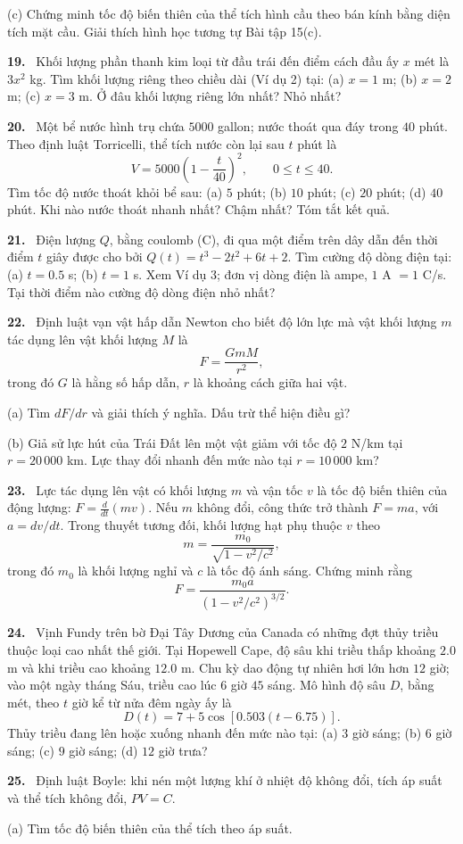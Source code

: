\documentclass[12pt,a4paper]{article}
\newcommand{\bt}[1]{\par\smallskip\noindent\textbf{#1.}\ }
\begin{document}
(c) Chứng minh tốc độ biến thiên của thể tích hình cầu theo bán kính bằng diện tích mặt cầu. Giải thích hình học tương tự Bài tập 15(c).
\bt{19} Khối lượng phần thanh kim loại từ đầu trái đến điểm cách đầu ấy $x$ mét là $3x^2$ kg. Tìm khối lượng riêng theo chiều dài (Ví dụ 2) tại: (a) $x=1$ m; (b) $x=2$ m; (c) $x=3$ m. Ở đâu khối lượng riêng lớn nhất? Nhỏ nhất?
\bt{20} Một bể nước hình trụ chứa $5000$ gallon; nước thoát qua đáy trong $40$ phút. Theo định luật Torricelli, thể tích nước còn lại sau $t$ phút là
\[V=5000\left(1-\frac t{40}\right)^2,\qquad0\le t\le40.\]
Tìm tốc độ nước thoát khỏi bể sau: (a) $5$ phút; (b) $10$ phút; (c) $20$ phút; (d) $40$ phút. Khi nào nước thoát nhanh nhất? Chậm nhất? Tóm tắt kết quả.
\bt{21} Điện lượng $Q$, bằng coulomb (C), đi qua một điểm trên dây dẫn đến thời điểm $t$ giây được cho bởi $Q(t)=t^3-2t^2+6t+2$. Tìm cường độ dòng điện tại: (a) $t=0.5$ s; (b) $t=1$ s. Xem Ví dụ 3; đơn vị dòng điện là ampe, $1$ A $=1$ C/s. Tại thời điểm nào cường độ dòng điện nhỏ nhất?
\bt{22} Định luật vạn vật hấp dẫn Newton cho biết độ lớn lực mà vật khối lượng $m$ tác dụng lên vật khối lượng $M$ là
\[F=\frac{GmM}{r^2},\]
trong đó $G$ là hằng số hấp dẫn, $r$ là khoảng cách giữa hai vật.

(a) Tìm $dF/dr$ và giải thích ý nghĩa. Dấu trừ thể hiện điều gì?

(b) Giả sử lực hút của Trái Đất lên một vật giảm với tốc độ $2$ N/km tại $r=20\,000$ km. Lực thay đổi nhanh đến mức nào tại $r=10\,000$ km?
\bt{23} Lực tác dụng lên vật có khối lượng $m$ và vận tốc $v$ là tốc độ biến thiên của động lượng: $F=\frac{d}{dt}(mv)$. Nếu $m$ không đổi, công thức trở thành $F=ma$, với $a=dv/dt$. Trong thuyết tương đối, khối lượng hạt phụ thuộc $v$ theo
\[m=\frac{m_0}{\sqrt{1-v^2/c^2}},\]
trong đó $m_0$ là khối lượng nghỉ và $c$ là tốc độ ánh sáng. Chứng minh rằng
\[F=\frac{m_0a}{(1-v^2/c^2)^{3/2}}.\]
\bt{24} Vịnh Fundy trên bờ Đại Tây Dương của Canada có những đợt thủy triều thuộc loại cao nhất thế giới. Tại Hopewell Cape, độ sâu khi triều thấp khoảng $2.0$ m và khi triều cao khoảng $12.0$ m. Chu kỳ dao động tự nhiên hơi lớn hơn $12$ giờ; vào một ngày tháng Sáu, triều cao lúc $6$ giờ $45$ sáng. Mô hình độ sâu $D$, bằng mét, theo $t$ giờ kể từ nửa đêm ngày ấy là
\[D(t)=7+5\cos[0.503(t-6.75)].\]
Thủy triều đang lên hoặc xuống nhanh đến mức nào tại: (a) $3$ giờ sáng; (b) $6$ giờ sáng; (c) $9$ giờ sáng; (d) $12$ giờ trưa?
\bt{25} Định luật Boyle: khi nén một lượng khí ở nhiệt độ không đổi, tích áp suất và thể tích không đổi, $PV=C$.

(a) Tìm tốc độ biến thiên của thể tích theo áp suất.
\end{document}
